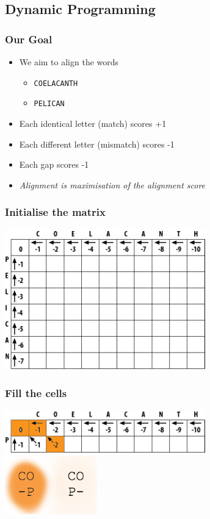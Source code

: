 \documentclass[table]{beamer}
\begin{document}
	\subsection{Dynamic Programming}
    \begin{frame}
     \frametitle{Our Goal}
     \begin{itemize}
       \item<1-> We aim to align the words
       \begin{itemize}
         \item<1-> \texttt{COELACANTH}
         \item<1-> \texttt{PELICAN}
       \end{itemize}
       \item<2-> Each identical letter (match) scores +1
       \item<2-> Each different letter (mismatch) scores -1
       \item<2-> Each gap scores -1
       \item<3-> \emph{Alignment is maximisation of the alignment score}
     \end{itemize}
    \end{frame}   
   
    \begin{frame}
     \frametitle{Initialise the matrix}
       \begin{center}
         \includegraphics[width=0.65\textwidth]{images/initialise}
       \end{center}
    \end{frame}   
   
    \begin{frame}
     \frametitle{Fill the cells}
       \begin{center}
         \includegraphics[width=0.65\textwidth]{images/fill_start} \\
         \includegraphics[width=0.3\textwidth]{images/fill_start_letters}
       \end{center}
    \end{frame}     
\end{document}
